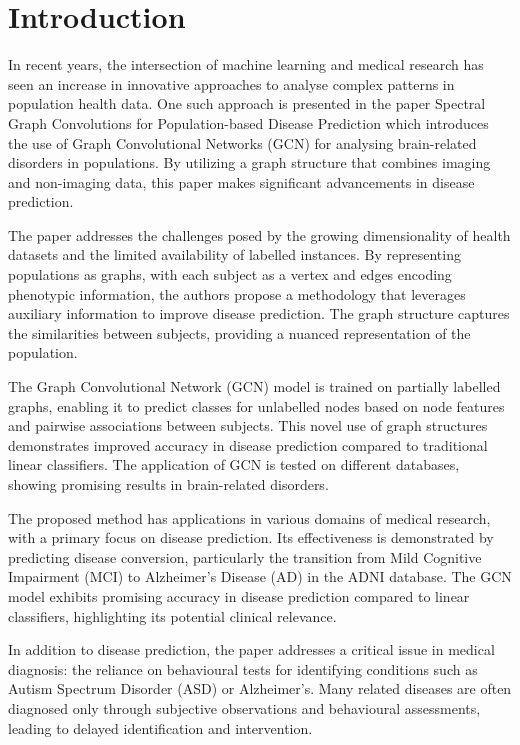 
\section{Introduction}


\quad In recent years, the intersection of machine learning and medical research has seen an increase in innovative approaches to analyse complex patterns in population health data. One such approach is presented in the paper Spectral Graph Convolutions for Population-based Disease Prediction \cite{Parisot17} which introduces the use of Graph Convolutional Networks (GCN) for analysing brain-related disorders in populations. By utilizing a graph structure that combines imaging and non-imaging data, this paper makes significant advancements in disease prediction.

The paper addresses the challenges posed by the growing dimensionality of health datasets and the limited availability of labelled instances. By representing populations as graphs, with each subject as a vertex and edges encoding phenotypic information, the authors propose a methodology that leverages auxiliary information to improve disease prediction. The graph structure captures the similarities between subjects, providing a nuanced representation of the population.

The Graph Convolutional Network (GCN) model is trained on partially labelled graphs, enabling it to predict classes for unlabelled nodes based on node features and pairwise associations between subjects. This novel use of graph structures demonstrates improved accuracy in disease prediction compared to traditional linear classifiers. The application of GCN is tested on different databases, showing promising results in brain-related disorders.

The proposed method has applications in various domains of medical research, with a primary focus on disease prediction. Its effectiveness is demonstrated by predicting disease conversion, particularly the transition from Mild Cognitive Impairment (MCI) to Alzheimer's Disease (AD) in the ADNI database. The GCN model exhibits promising accuracy in disease prediction compared to linear classifiers, highlighting its potential clinical relevance.

In addition to disease prediction, the paper addresses a critical issue in medical diagnosis: the reliance on behavioural tests for identifying conditions such as Autism Spectrum Disorder (ASD) or Alzheimer's. Many related diseases are often diagnosed only through subjective observations and behavioural assessments, leading to delayed identification and intervention.

